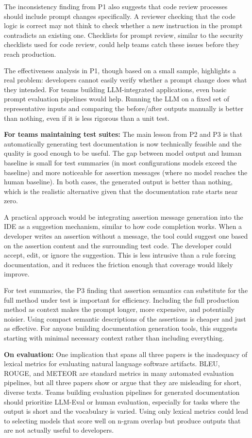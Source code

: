 \documentclass[
    pdftex,
    final,
    11pt,
    a4paper,
    parskip=false,
    oneside,
    footheight=0mm,
    footinclude=false,
    toc=bibliography
]{scrbook}
\begin{document}
The inconsistency finding from P1 also suggests that code review processes should include prompt changes specifically. A reviewer checking that the code logic is correct may not think to check whether a new instruction in the prompt contradicts an existing one. Checklists for prompt review, similar to the security checklists used for code review, could help teams catch these issues before they reach production.

The effectiveness analysis in P1, though based on a small sample, highlights a real problem: developers cannot easily verify whether a prompt change does what they intended. For teams building LLM-integrated applications, even basic prompt evaluation pipelines would help. Running the LLM on a fixed set of representative inputs and comparing the before/after outputs manually is better than nothing, even if it is less rigorous than a unit test.

\textbf{For teams maintaining test suites:} The main lesson from P2 and P3 is that automatically generating test documentation is now technically feasible and the quality is good enough to be useful. The gap between model output and human baseline is small for test summaries (in most configurations models exceed the baseline) and more noticeable for assertion messages (where no model reaches the human baseline). In both cases, the generated output is better than nothing, which is the realistic alternative given that the documentation rate starts near zero.

A practical approach would be integrating assertion message generation into the IDE as a suggestion mechanism, similar to how code completion works. When a developer writes an assertion without a message, the tool could suggest one based on the assertion content and the surrounding test code. The developer could accept, edit, or ignore the suggestion. This is less intrusive than a rule forcing documentation, and it reduces the friction enough that coverage would likely improve.

For test summaries, the P3 finding that assertion semantics can substitute for the full method under test is important for efficiency. Including the full production method as context makes the prompt longer, more expensive, and potentially noisier. Using compact semantic descriptions of the assertions is cheaper and just as effective. For anyone building documentation generation tools, this suggests starting with minimal necessary context rather than including everything.

\textbf{On evaluation:} One implication that spans all three papers is the inadequacy of lexical metrics for evaluating natural language software artifacts. BLEU, ROUGE, and METEOR are standard metrics in many automated evaluation pipelines, but all three papers show or argue that they are misleading for short, diverse texts. Teams building evaluation pipelines for generated documentation should prioritize LLM-Eval or human evaluation, especially for tasks where the output is short and the vocabulary is varied. Using only lexical metrics could lead to selecting models that score well on n-gram overlap but produce outputs that are not actually useful to developers.
\end{document}
